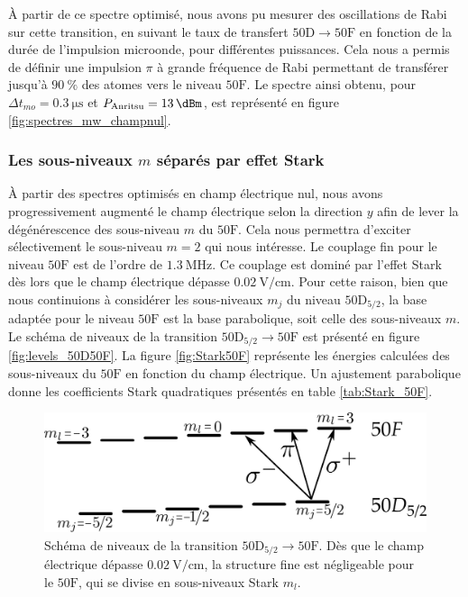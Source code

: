 À partir de ce spectre optimisé, nous avons pu mesurer des oscillations de Rabi sur cette transition, en suivant le taux de transfert $\mathrm{50D \rightarrow 50F}$ en fonction de la durée de l'impulsion microonde, pour différentes puissances.
Cela nous a permis de définir une impulsion $\pi$ à grande fréquence de Rabi permettant de transférer jusqu'à $\SI{90}{\percent}$ des atomes vers le niveau $\mathrm{50F}$.
Le spectre ainsi obtenu, pour $\Delta t_{mo} = \SI{0.3}{\us}$ et $P_{\text{Anritsu}} = \SI{13}{\dBm}$, est représenté en figure \eqref{fig:spectres_mw_champnul}.

\newpage
\subsubsection*{Les sous-niveaux $m$ séparés par effet Stark}
\noindent \`A partir des spectres optimisés en champ électrique nul, nous avons progressivement augmenté le champ électrique selon la direction $y$ afin de lever la dégénérescence des sous-niveau $m$ du $\mathrm{50F}$.
Cela nous permettra d'exciter sélectivement le sous-niveau \linebreak $m=2$ qui nous intéresse.
Le couplage fin pour le niveau $\mathrm{50F}$ est de l'ordre de $\SI{1.3}{\MHz}$.
Ce couplage est dominé par l'effet Stark dès lors que le champ électrique dépasse $\SI{0.02}{\V/\cm}$.
Pour cette raison, bien que nous continuions à considérer les sous-niveaux $m_j$ du niveau $\mathrm{50D}_{5/2}$, la base adaptée pour le niveau $\mathrm{50F}$ est la base parabolique, soit celle des sous-niveaux $m$.
Le schéma de niveaux de la transition $\mathrm{50D}_{5/2}\rightarrow\mathrm{50F}$ est présenté en figure \eqref{fig:levels_50D50F}.
La figure \eqref{fig:Stark50F} représente les énergies calculées des sous-niveaux du $\mathrm{50F}$ en fonction du champ électrique.
Un ajustement parabolique donne les coefficients Stark quadratiques présentés en table \eqref{tab:Stark_50F}.

\begin{figure}[h]
\centering
\includegraphics[width=0.7\linewidth]{figures/circulars/levels_50D50F}
\caption[Schéma de niveaux de la transition $\mathrm{50D\rightarrow 50F}$]{
Schéma de niveaux de la transition $\mathrm{50D_{5/2}\rightarrow 50F}$.
Dès que le champ électrique dépasse $\SI{0.02}{\V/\cm}$, la structure fine est négligeable pour le $\mathrm{50F}$, qui se divise en sous-niveaux Stark $m_l$.
}
\label{fig:levels_50D50F}
\end{figure}

